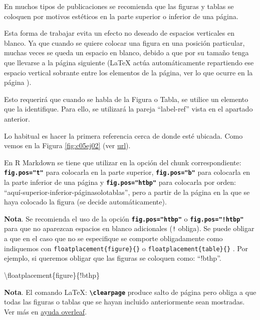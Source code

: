 \documentclass[12pt,a4paper,]{book}
\newenvironment{Shaded}{\begin{snugshade}}{\end{snugshade}}
\newcommand{\FunctionTok}[1]{\textcolor[rgb]{0.00,0.00,0.00}{#1}}
\newcommand{\NormalTok}[1]{#1}
\numberwithin{dummy}{section}
\theoremstyle{ocrenumbox}
\theoremstyle{blacknumex}
\theoremstyle{blacknumbox}
\theoremstyle{ocrenum}
\theoremstyle{ocrenum}
\begin{document}
En muchos tipos de publicaciones se recomienda que las figuras y tablas
se coloquen por motivos estéticos en la parte superior o inferior de una
página.

Esta forma de trabajar evita un efecto no deseado de espacios verticales
en blanco. Ya que cuando se quiere colocar una figura en una posición
particular, muchas veces se queda un espacio en blanco, debido a que por
su tamaño tenga que llevarse a la página siguiente (LaTeX actúa
automáticamente repartiendo ese espacio vertical sobrante entre los
elementos de la página, ver lo que ocurre en la página
\pageref{sec:incluirgrafico}).

Esto requerirá que cuando se habla de la Figura o Tabla, se utilice un
elemento que la identifique. Para ello, se utilizará la pareja
``label-ref'' vista en el apartado anterior.

Lo habitual es hacer la primera referencia cerca de donde esté ubicada.
Como vemos en la Figura \ref{fig:c05ej02} (ver
\href{https://resource-cms.springernature.com/springer-cms/rest/v1/content/19112/data/v5}{url}).

En R Markdown se tiene que utilizar en la opción del chunk
correspondiente: \textbf{\texttt{fig.pos="t"}} para colocarla en la
parte superior, \textbf{\texttt{fig.pos="b"}} para colocarla en la parte
inferior de una página y \textbf{\texttt{fig.pos="htbp"}} para colocarla
por orden: ``aquí-superior-inferior-páginasolotablas'', pero a partir de
la página en la que se haya colocado la figura (se decide
automáticamente).

\textbf{Nota}. Se recomienda el uso de la opción
\textbf{\texttt{fig.pos="htbp"}} o \textbf{\texttt{fig.pos="!htbp"}}
para que no aparezcan espacios en blanco adicionales (\texttt{!}
obliga). Se puede obligar a que en el caso que no se especifique se
comporte obligadamente como indiquemos con
\texttt{floatplacement\{figure\}\{\}} o
\texttt{floatplacement\{table\}\{\}} . Por ejemplo, si queremos obligar
que las figuras se coloquen como: ``!bthp''.

\begin{Shaded}
\begin{Highlighting}[]
\FunctionTok{\textbackslash{}floatplacement}\NormalTok{\{figure\}\{!bthp\}}
\end{Highlighting}
\end{Shaded}

\textbf{Nota}. El comando LaTeX:
\textbf{\texttt{\textbackslash{}clearpage}} produce salto de página pero
obliga a que todas las figuras o tablas que se hayan incluido
anteriormente sean mostradas. Ver más en
\href{https://es.overleaf.com/learn/latex/Line_breaks_and_blank_spaces\#Espacios_verticales_en_blanco}{ayuda
overleaf}.
\end{document}
